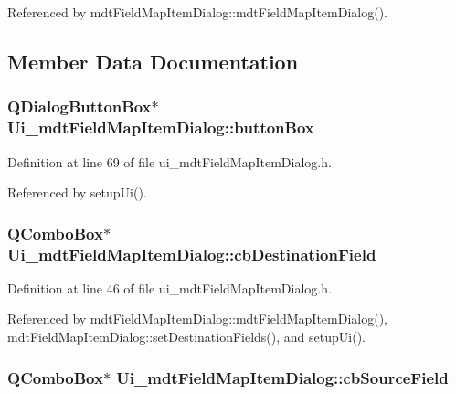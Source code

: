 Referenced by mdt\-Field\-Map\-Item\-Dialog\-::mdt\-Field\-Map\-Item\-Dialog().



\subsection{Member Data Documentation}
\hypertarget{class_ui__mdt_field_map_item_dialog_a0dc097731c70dca1ac8c5abfd044fcc9}{
\subsubsection[{button\-Box}]{\setlength{\rightskip}{0pt plus 5cm}Q\-Dialog\-Button\-Box$\ast$ Ui\-\_\-mdt\-Field\-Map\-Item\-Dialog\-::button\-Box}}\label{class_ui__mdt_field_map_item_dialog_a0dc097731c70dca1ac8c5abfd044fcc9}


Definition at line 69 of file ui\-\_\-mdt\-Field\-Map\-Item\-Dialog.\-h.



Referenced by setup\-Ui().

\hypertarget{class_ui__mdt_field_map_item_dialog_a6cdf15157ac609486126eb129762af6b}{
\subsubsection[{cb\-Destination\-Field}]{\setlength{\rightskip}{0pt plus 5cm}Q\-Combo\-Box$\ast$ Ui\-\_\-mdt\-Field\-Map\-Item\-Dialog\-::cb\-Destination\-Field}}\label{class_ui__mdt_field_map_item_dialog_a6cdf15157ac609486126eb129762af6b}


Definition at line 46 of file ui\-\_\-mdt\-Field\-Map\-Item\-Dialog.\-h.



Referenced by mdt\-Field\-Map\-Item\-Dialog\-::mdt\-Field\-Map\-Item\-Dialog(), mdt\-Field\-Map\-Item\-Dialog\-::set\-Destination\-Fields(), and setup\-Ui().

\hypertarget{class_ui__mdt_field_map_item_dialog_af8e0ec7ce4f5c79781765040b331e008}{
\subsubsection[{cb\-Source\-Field}]{\setlength{\rightskip}{0pt plus 5cm}Q\-Combo\-Box$\ast$ Ui\-\_\-mdt\-Field\-Map\-Item\-Dialog\-::cb\-Source\-Field}}\label{class_ui__mdt_field_map_item_dialog_af8e0ec7ce4f5c79781765040b331e008}


